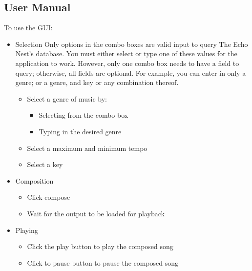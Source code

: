 \documentclass{article}
\begin{document}
\subsection{User Manual}
To use the GUI:
\begin{itemize}
\item Selection
Only options in the combo boxes are valid input to query The Echo Nest’s database. You must either select or type one of these values for the application to work.  However, only one combo box needs to have a field to query; otherwise, all fields are optional.  For example, you can enter in only a genre; or a genre, and key or any combination thereof.
\begin{itemize}

\item Select a genre of music by:
\begin{itemize}

\item Selecting from the combo box
\item Typing in the desired genre
\end{itemize}

\item Select a maximum and minimum tempo

\item Select a key
\end{itemize}

\item Composition
\begin{itemize}
\item Click compose
\item Wait for the output to be loaded for playback
\end{itemize}

\item Playing
\begin{itemize}
\item Click the play button to play the composed song
\item Click to pause button to pause the composed song
\end{itemize}
\end{itemize}
\end{document}
